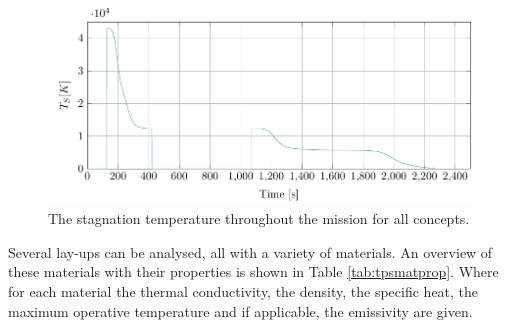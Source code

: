 \begin{figure}[H]
	\centering
	\includegraphics{Figure/stagnationtemp.pdf}
	\caption{The stagnation temperature throughout the mission for all concepts.}
	\label{fig:stagnationtemp}
\end{figure}

Several lay-ups can be analysed, all with a variety of materials. An overview of these materials with their properties is shown in Table  \ref{tab:tpsmatprop}. Where for each material the thermal conductivity, the density, the specific heat, the maximum operative temperature and if applicable, the emissivity are given.

